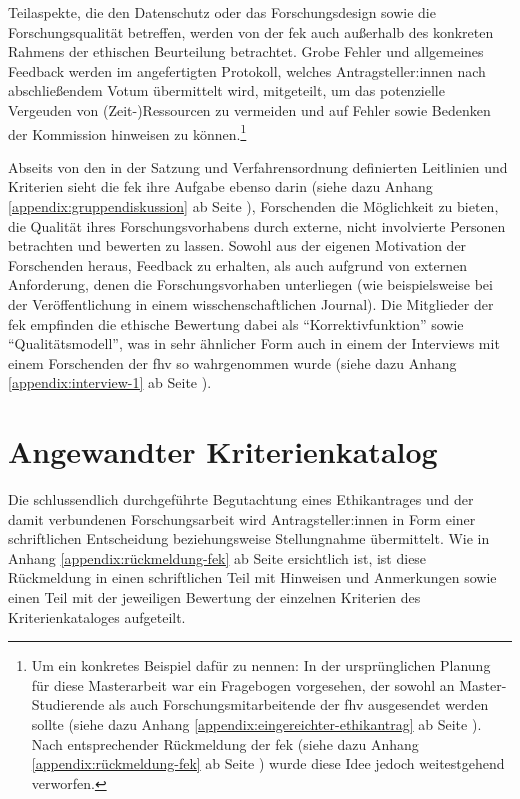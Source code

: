 \documentclass[a4paper,12pt,twoside]{scrreprt}
\begin{document}
Teilaspekte, die den Datenschutz oder das Forschungsdesign sowie die Forschungsqualität betreffen, werden von der \ac{fek} auch außerhalb des konkreten Rahmens der ethischen Beurteilung betrachtet. Grobe Fehler und allgemeines Feedback werden im angefertigten Protokoll, welches Antragsteller:innen nach abschließendem Votum übermittelt wird, mitgeteilt, um das potenzielle Vergeuden von (Zeit-)Ressourcen zu vermeiden und auf Fehler sowie Bedenken der Kommission hinweisen zu können.\footnote{Um ein konkretes Beispiel dafür zu nennen: In der ursprünglichen Planung für diese Masterarbeit war ein Fragebogen vorgesehen, der sowohl an Master-Studierende als auch Forschungsmitarbeitende der \ac{fhv} ausgesendet werden sollte (siehe dazu Anhang \ref{appendix:eingereichter-ethikantrag} ab Seite \pageref{appendix:eingereichter-ethikantrag}). Nach entsprechender Rückmeldung der \ac{fek} (siehe dazu Anhang \ref{appendix:rückmeldung-fek} ab Seite \pageref{appendix:rückmeldung-fek}) wurde diese Idee jedoch weitestgehend verworfen.\label{footnote:ursprüngliche-planung-leitfaden}} \cite[1\psq]{forschungsethik-kommission_der_fachhochschule_vorarlberg_verfahrensordnung_2020}

\medskip

Abseits von den in der Satzung und Verfahrensordnung definierten Leitlinien und Kriterien sieht die \ac{fek} ihre Aufgabe ebenso darin (siehe dazu Anhang \ref{appendix:gruppendiskussion} ab Seite \pageref{appendix:gruppendiskussion}), Forschenden die Möglichkeit zu bieten, die Qualität ihres Forschungsvorhabens durch externe, nicht involvierte Personen betrachten und bewerten zu lassen. Sowohl aus der eigenen Motivation der Forschenden heraus, Feedback zu erhalten, als auch aufgrund von externen Anforderung, denen die Forschungsvorhaben unterliegen (wie beispielsweise bei der Veröffentlichung in einem wisschenschaftlichen Journal). Die Mitglieder der \ac{fek} empfinden die ethische Bewertung dabei als \enquote{Korrektivfunktion} sowie \enquote{Qualitätsmodell}, was in sehr ähnlicher Form auch in einem der Interviews mit einem Forschenden der \ac{fhv} so wahrgenommen wurde (siehe dazu Anhang \ref{appendix:interview-1} ab Seite \pageref{appendix:interview-1}).

\section{Angewandter Kriterienkatalog}
\label{sec:angewandter-kriterienkatalog}

Die schlussendlich durchgeführte Begutachtung eines Ethikantrages und der damit verbundenen Forschungsarbeit wird Antragsteller:innen in Form einer schriftlichen Entscheidung beziehungsweise Stellungnahme übermittelt. \cite[4]{forschungsethik-kommission_der_fachhochschule_vorarlberg_verfahrensordnung_2020} Wie in Anhang \ref{appendix:rückmeldung-fek} ab Seite \pageref{appendix:rückmeldung-fek} ersichtlich ist, ist diese Rückmeldung in einen schriftlichen Teil mit Hinweisen und Anmerkungen sowie einen Teil mit der jeweiligen Bewertung der einzelnen Kriterien des Kriterienkataloges aufgeteilt.
\end{document}
